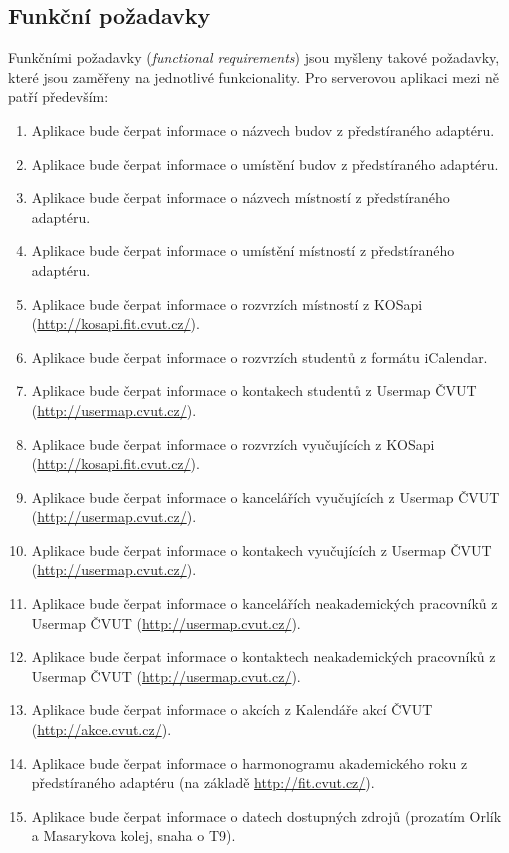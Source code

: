 \subsection{Funkční požadavky}
Funkčními požadavky (\textit{functional requirements}) jsou myšleny takové požadavky, které jsou zaměřeny na jednotlivé funkcionality. Pro serverovou aplikaci mezi ně patří především:
\begin{enumerate}
 \item Aplikace bude čerpat informace o názvech budov z předstíraného adaptéru.
 \item Aplikace bude čerpat informace o umístění budov z předstíraného adaptéru.
 \item Aplikace bude čerpat informace o názvech místností z předstíraného adaptéru.
 \item Aplikace bude čerpat informace o umístění místností z předstíraného adaptéru.
 \item Aplikace bude čerpat informace o rozvrzích místností z KOSapi (\url{http://kosapi.fit.cvut.cz/}). 
 \item Aplikace bude čerpat informace o rozvrzích studentů z formátu iCalendar.
 \item Aplikace bude čerpat informace o kontakech studentů z Usermap ČVUT (\url{http://usermap.cvut.cz/}).
 \item Aplikace bude čerpat informace o rozvrzích vyučujících z KOSapi (\url{http://kosapi.fit.cvut.cz/}). 
 \item Aplikace bude čerpat informace o kancelářích vyučujících z Usermap ČVUT (\url{http://usermap.cvut.cz/}).
 \item Aplikace bude čerpat informace o kontakech vyučujících z Usermap ČVUT (\url{http://usermap.cvut.cz/}).
 \item Aplikace bude čerpat informace o kancelářích neakademických pracovníků z Usermap ČVUT (\url{http://usermap.cvut.cz/}).
 \item Aplikace bude čerpat informace o kontaktech neakademických pracovníků z Usermap ČVUT (\url{http://usermap.cvut.cz/}).
 \item Aplikace bude čerpat informace o akcích  z Kalendáře akcí ČVUT (\url{http://akce.cvut.cz/}).
 \item Aplikace bude čerpat informace o harmonogramu akademického roku z předstíraného adaptéru (na základě \url{http://fit.cvut.cz/}).
 \item Aplikace bude čerpat informace o datech  dostupných zdrojů (prozatím Orlík a Masarykova kolej, snaha o T9).

\end{enumerate}
